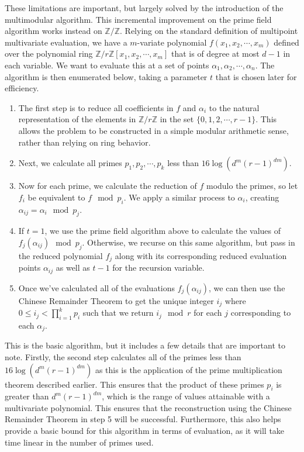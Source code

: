 \documentclass[pageno]{jpaper}
\begin{document}
These limitations are important, but largely solved by the introduction of the multimodular algorithm.
This incremental improvement on the prime field algorithm works instead on $\mathbb{Z}/\mathbb{Z}$.
Relying on the standard definition of multipoint multivariate evaluation, we have a $m$-variate polynomial $f(x_1, x_2, \cdots, x_m)$ defined over the polynomial ring $\mathbb{Z}/r\mathbb{Z}[x_1, x_2, \cdots, x_m]$ that is of degree at most $d-1$ in each variable.
We want to evaluate this at a set of points $\alpha_1, \alpha_2, \cdots, \alpha_n$.
The algorithm is then enumerated below, taking a parameter $t$ that is chosen later for efficiency.
\begin{enumerate} 
  \item 
    The first step is to reduce all coefficients in $f$ and $\alpha_i$ to the natural representation of the elements in $\mathbb{Z}/r\mathbb{Z}$ in the set $\{0, 1, 2, \cdots, r-1\}$.
    This allows the problem to be constructed in a simple modular arithmetic sense, rather than relying on ring behavior.
  \item
    Next, we calculate all primes $p_1, p_2, \cdots, p_k$ less than $16\log(d^m (r-1)^{dm})$.
  \item
    Now for each prime, we calculate the reduction of $f$ modulo the primes, so let $f_i$ be equivalent to $f \mod p_i$.
    We apply a similar process to $\alpha_i$, creating $\alpha_{ij} = \alpha_i\mod p_j$.
  \item 
    If $t=1$, we use the prime field algorithm above to calculate the values of $f_j(\alpha_{ij}) \mod p_j$.
    Otherwise, we recurse on this same algorithm, but pass in the reduced polynomial $f_j$ along with its corresponding reduced evaluation points $\alpha_{ij}$ as well as $t-1$ for the recursion variable.
  \item
    Once we've calculated all of the evaluations $f_j(\alpha_{ij})$, we can then use the Chinese Remainder Theorem to get the unique integer $i_j$ where $0 \leq i_j < \prod_{i=1}^k p_i$ such that we return $i_j\mod r$ for each $j$ corresponding to each $\alpha_j$.
\end{enumerate}

This is the basic algorithm, but it includes a few details that are important to note.
Firstly, the second step calculates all of the primes less than $16\log(d^m (r-1)^{dm})$ as this is the application of the prime multiplication theorem described earlier.
This ensures that the product of these primes $p_i$ is greater than $d^m (r-1)^{dm}$, which is the range of values attainable with a multivariate polynomial.
This ensures that the reconstruction using the Chinese Remainder Theorem in step 5 will be successful.
Furthermore, this also helps provide a basic bound for this algorithm in terms of evaluation, as it will take time linear in the number of primes used.
\end{document}
